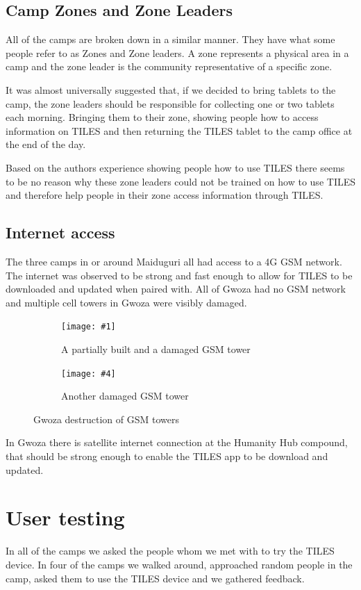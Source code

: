 \documentclass[11pt]{article}
\newcommand*{\twoImages}[8]{
	\begin{figure}[H]
		\centering
		  \begin{subfigure}{0.475\textwidth}
			\texttt{[image: \#1]}
			  \caption{#2}
			  \label{#3}
		  \end{subfigure}
		  \hfill
		  \begin{subfigure}{0.475\textwidth}
			\texttt{[image: \#4]}
			  \caption{#5}
			  \label{#6}
		  \end{subfigure}
	\caption{#7}
	\label{#8}
	\end{figure}
}
\begin{document}
\subsection{Camp Zones and Zone Leaders}
All of the camps are broken down in a similar manner. They have what some people refer to as Zones and Zone leaders. A zone represents a physical area in a camp and the zone leader is the community representative of a specific zone. 

It was almost universally suggested that, if we decided to bring tablets to the camp, the zone leaders should be responsible for collecting one or two tablets each morning. Bringing them to their zone, showing people how to access information on TILES and then returning the TILES tablet to the camp office at the end of the day. 

Based on the authors experience showing people how to use TILES there seems to be no reason why these zone leaders could not be trained on how to use TILES and therefore help people in their zone access information through TILES. 

\subsection{Internet access}
The three camps in or around Maiduguri all had access to a 4G GSM network. The internet was observed to be strong and fast enough to allow for TILES to be downloaded and updated when paired with. All of Gwoza had no GSM network and multiple cell towers in Gwoza were visibly damaged. 

\twoImages{images/gwoza_down_gsm_tower.png}
{A partially built and a damaged GSM tower}
{}
{images/gwoza_down_gsm_tower_hele.png}
{Another damaged GSM tower}
{}
{Gwoza destruction of GSM towers}
{}

In Gwoza there is satellite internet connection at the Humanity Hub compound, that should be strong enough to enable the TILES app to be download and updated. 

\section{User testing}

In all of the camps we asked the people whom we met with to try the TILES device. In four of the camps we walked around, approached random people in the camp, asked them to use the TILES device and we gathered feedback.
\end{document}
